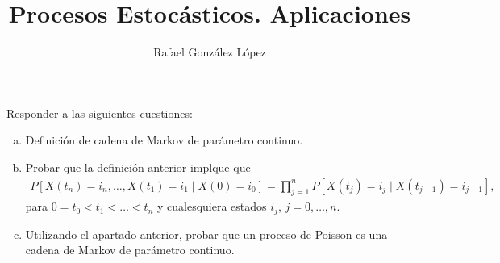 \documentclass[twoside]{article}
\begin{document}
\title{Procesos Estocásticos. Aplicaciones}
\author{Rafael González López}
\maketitle
\begin{ejercicio}{1} 
Responder a las siguientes cuestiones:
\begin{enumerate}[a)]
\item Definición de cadena de Markov de parámetro continuo.
\item Probar que la definición anterior implque que
\begin{align*}
P[X(t_n)=i_n,\dotsc,X(t_1)=i_1 \mid X(0)=i_0] = \prod_{j=1}^n P[X(t_j) = i_j \mid X(t_{j-1})=i_{j-1}],
\end{align*}
para $0=t_0<t_1<\dotsc<t_n$ y cualesquiera estados $i_j$, $j=0,\dotsc,n$.
\item Utilizando el apartado anterior, probar que un proceso de Poisson es una cadena de Markov de parámetro continuo.
\end{enumerate}
\end{ejercicio}
\end{document}
